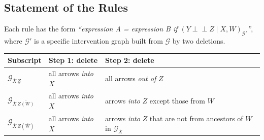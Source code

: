 \documentclass[
  a4paper,
]{book}
\newcounter{none} %
\newcommand{\indep}{\perp\!\!\!\perp}
\newcommand{\Gcal}{\mathcal{G}}
\begin{document}
\subsection{Statement of the Rules}\label{statement-of-the-rules}

Each rule has the form \emph{``expression A = expression B if
\((Y \indep Z \mid X, W)_{\Gcal'}\)''}, where \(\Gcal'\) is a specific
intervention graph built from \(\Gcal\) by two deletions.

{\def\LTcaptype{none} %
\begin{longtable}[]{@{}
  >{\raggedright\arraybackslash}p{}
  >{\raggedright\arraybackslash}p{}
  >{\raggedright\arraybackslash}p{}@{}}
\toprule\noalign{}
\begin{minipage}[b]{\linewidth}\raggedright
\textbf{Subscript}
\end{minipage} & \begin{minipage}[b]{\linewidth}\raggedright
\textbf{Step 1: delete}
\end{minipage} & \begin{minipage}[b]{\linewidth}\raggedright
\textbf{Step 2: delete}
\end{minipage} \\
\midrule\noalign{}
\endhead
\bottomrule\noalign{}
\endlastfoot
\(\Gcal_{\overline{X}\,\underline{Z}}\) & all arrows \emph{into} \(X\) &
all arrows \emph{out of} \(Z\) \\
\(\Gcal_{\overline{X}\,\overline{Z(W)}}\) & all arrows \emph{into} \(X\)
& arrows \emph{into} \(Z\) except those from \(W\) \\
\(\Gcal_{\overline{X}\,\overline{Z(\overline{W})}}\) & all arrows
\emph{into} \(X\) & arrows \emph{into} \(Z\) that are not from ancestors
of \(W\) in \(\Gcal_{\overline{X}}\) \\
\end{longtable}
}
\end{document}

